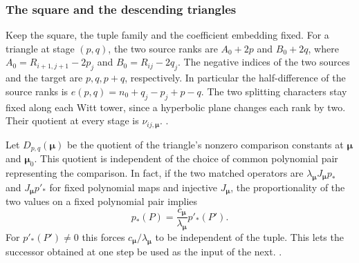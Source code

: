 \subsubsection{The square and the descending triangles}
Keep the square, the tuple family and the coefficient embedding fixed.
For a triangle at stage \((p,q)\), the two source ranks are
\(A_0+2p\) and \(B_0+2q\), where
\(A_0=R_{i+1,j+1}-2p_j\) and \(B_0=R_{ij}-2q_j\).
The negative indices of the two sources and the target are
\(p,q,p+q\), respectively. In particular the half-difference of the
source ranks is \(e(p,q)=n_0+q_j-p_j+p-q\).
The two splitting characters stay fixed along each Witt tower,
since a hyperbolic plane changes each rank by two. Their quotient at
every stage is \(\nu_{ij,\boldsymbol\mu}\).
.

Let \(D_{p,q}(\boldsymbol\mu)\) be the quotient of the triangle's
nonzero comparison constants at \(\boldsymbol\mu\) and \(\boldsymbol\mu_0\).
This quotient is independent of the choice of common polynomial pair
representing the comparison. In fact, if the two matched operators
are \(\lambda_{\boldsymbol\mu} J_{\boldsymbol\mu}p_*\) and
\(J_{\boldsymbol\mu}p'_*\) for fixed polynomial maps and injective
\(J_{\boldsymbol\mu}\), the proportionality of the two values on a
fixed polynomial pair implies
\begin{equation}
   p_*(P)=\frac{c_{\boldsymbol\mu}}{\lambda_{\boldsymbol\mu}}p'_*(P').
   \label{eq:period-triangle-pair-normalization}
\end{equation}
For \(p'_*(P')\ne0\) this forces \(c_{\boldsymbol\mu}/\lambda_{\boldsymbol\mu}\)
to be independent of the tuple. This lets the successor obtained at
one step be used as the input of the next.
.

